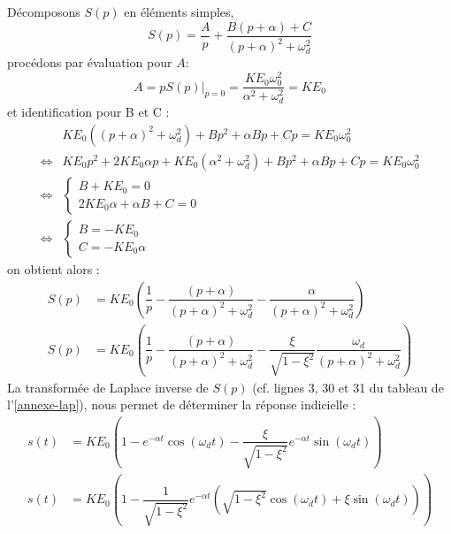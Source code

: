 Décomposons $S(p)$ en éléments simples,
\[
S(p)=\dfrac{A}{p} + \dfrac{B(p+\alpha)+C}{(p+\alpha)^2+\omega^2_d}
\]
procédons par évaluation pour $A$:
\[
A=pS(p)\Big|_{p=0}=\dfrac{KE_0\omega^2_0}{\alpha^2+\omega^2_d}=KE_0
\]
et identification pour B et C :
\begin{align*}
    &KE_0((p+\alpha)^2+\omega^2_d) + Bp^2+\alpha Bp+Cp = KE_0\omega^2_0 \\
    \iff & KE_0p^2+2KE_0\alpha p+KE_0(\alpha^2+\omega^2_d) + Bp^2+\alpha Bp+Cp 
    = KE_0\omega^2_0 \\ 
    \iff & 
    \begin{cases}
      B+KE_0 = 0 \\ 
      2KE_0\alpha+\alpha B+C=0
    \end{cases} \\
    \iff & \begin{cases}
            B=-KE_0     \\
            C=-KE_0\alpha
            \end{cases}
\end{align*}
on obtient alors :
\begin{align*}
    S(p)&=KE_0\left(\dfrac{1}{p} - 
          \dfrac{(p+\alpha)}{(p+\alpha)^2+\omega^2_d} - 
          \dfrac{\alpha}{(p+\alpha)^2+\omega^2_d}\right) \\
    S(p)&=KE_0\left(\dfrac{1}{p} - 
          \dfrac{(p+\alpha)}{(p+\alpha)^2+\omega^2_d} - 
          \dfrac{\xi}{\sqrt{1-\xi^2}} 
          \dfrac{\omega_d}{(p+\alpha)^2+\omega^2_d}\right)
\end{align*}
La transformée de Laplace inverse de $S(p)$ (cf. lignes 3, 30 et 
31 du tableau de l'\cref{annexe-lap}), nous permet de déterminer 
la réponse indicielle :
\begin{align*}
    s(t) &= KE_0\left(1 - 
            e^{-\alpha t}\cos{(\omega_d t)} - 
            \dfrac{\xi}{\sqrt{1-\xi^2}} 
            e^{-\alpha t}\sin{(\omega_d t)}\right) \\
    s(t) &= KE_0\left( 1- 
            \dfrac{1}{\sqrt{1-\xi^2}} 
            e^{-\alpha t}
            \left ( \sqrt{1-\xi^2}\cos{(\omega_d t)} 
            + \xi\sin{(\omega_d t)}\right)\right) \\
\end{align*}

